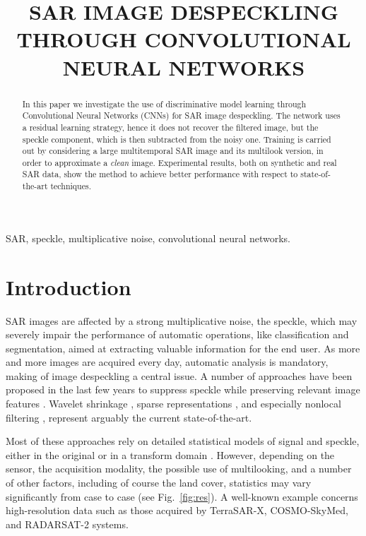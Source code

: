 \documentclass{article}
\title{SAR IMAGE DESPECKLING THROUGH CONVOLUTIONAL NEURAL NETWORKS}
\begin{document}
%
\maketitle
%
\begin{abstract}
In this paper we investigate the use of discriminative model learning through Convolutional Neural Networks (CNNs) for SAR image despeckling.
The network uses a residual learning strategy,
hence it does not recover the filtered image,
but the speckle component, which is then subtracted from the noisy one.
Training is carried out by considering a large multitemporal SAR image
and its multilook version, in order to approximate a {\em clean} image.
Experimental results, both on synthetic and real SAR data, show the method
to achieve better performance with respect to state-of-the-art techniques.
\end{abstract}
%
\begin{keywords}
SAR, speckle, multiplicative noise, convolutional neural networks.
\end{keywords}
%

\section{Introduction}
SAR images are affected by a strong multiplicative noise, the speckle,
which may severely impair the performance of automatic operations, like classification and segmentation, aimed at extracting valuable information for the end user.
As more and more images are acquired every day, automatic analysis is mandatory, making of image despeckling a central issue.
A number of approaches have been proposed in the last few years to suppress speckle while preserving relevant image features \cite{Argenti2013}.
Wavelet shrinkage \cite{Bianchi2008}, sparse representations \cite{Foucher2008}, and especially nonlocal filtering \cite{Deledalle2009, Parrilli2012, Cozzolino2014, Deledalle2015},
represent arguably the current state-of-the-art.

Most of these approaches rely on detailed statistical models of signal and speckle, either in the original or in a transform domain \cite{Argenti2013}.
However, depending on the sensor, the acquisition modality, the possible use of multilooking, and a number of other factors, including of course the land cover,
statistics may vary significantly from case to case (see Fig.~\ref{fig:res}).
A well-known example concerns high-resolution data such as those acquired by TerraSAR-X, COSMO-SkyMed, and RADARSAT-2 systems.
\end{document}
